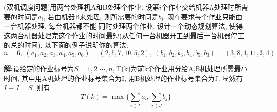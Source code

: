 \begin{problem}[习题5.2]
(双机调度问题)用两台处理机A和B处理个作业. 设第$i$个作业交给机器A处理时所需要的时间是$a_i$,
若由机器B来处理, 则所需要的时间是$b_i$. 现在要求每个作业只能由一台机器处理, 每台机器都不能
同时处理两个作业. 设计一个动态规划算法, 使得这两台机器处理完这个作业的时间最短(从任何一台机器开工到最后一台机器停工的总的时间). 以下面的例子说明你的算法:
\[
n = 6, {~} (a_1, a_2, a_3, a_4, a_5, a_6) = (2, 5, 7, 10, 5, 2), {~} (b_1, b_2, b_3, b_4, b_5, b_3) = (3, 8, 4, 11, 3, 4)
\]
\end{problem}
\begin{solution}
\textbf{解:}设给定的作业标号为$S={1,2,\cdots,n}$, T(k)为前k个作业用分给A,B机处理所需最小时间, 其中用A机处理的作业标号集合为I, 用B机处理的作业标号集合为J. 显然有$I + J = S$. 则有
\[
T(k) = \max\{\sum\limits_{i\in I}a_i, \sum\limits_{j\in J}b_j\}
\]



\end{solution}
